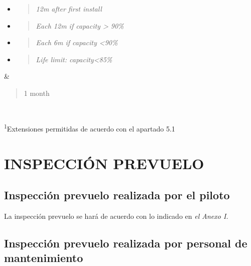 \documentclass[
]{article}
\begin{document}
\begin{longtable}[]
{\begin{minipage}[t]{\linewidth}
\begin{itemize}
\item
  \begin{quote}
  \emph{12m after first install}
  \end{quote}
\item
  \begin{quote}
  \emph{Each 12m if capacity \textgreater{} 90\%}
  \end{quote}
\item
  \begin{quote}
  \emph{Each 6m if capacity \textless90\%}
  \end{quote}
\item
  \begin{quote}
  \emph{Life limit: capacity\textless85\%}
  \end{quote}
\end{itemize}
\end{minipage}} & \begin{minipage}[t]{\linewidth}\raggedright
\begin{quote}
1 month
\end{quote}
\end{minipage} \\
\hline
\end{longtable}

\textsuperscript{1}Extensiones permitidas de acuerdo con el apartado 5.1
\restoregeometry

\newpage

\hypertarget{inspecciuxf3n-prevuelo}{%
\section{INSPECCIÓN PREVUELO}\label{inspecciuxf3n-prevuelo}}

\hypertarget{inspecciuxf3n-prevuelo-realizada-por-el-piloto}{%
\subsection{Inspección prevuelo realizada por el
piloto}\label{inspecciuxf3n-prevuelo-realizada-por-el-piloto}}

La inspección prevuelo se hará de acuerdo con lo indicado en \emph{el
Anexo I.}

\hypertarget{inspecciuxf3n-prevuelo-realizada-por-personal-de-mantenimiento}{%
\subsection{Inspección prevuelo realizada por personal de
mantenimiento}\label{inspecciuxf3n-prevuelo-realizada-por-personal-de-mantenimiento}}
\end{document}
